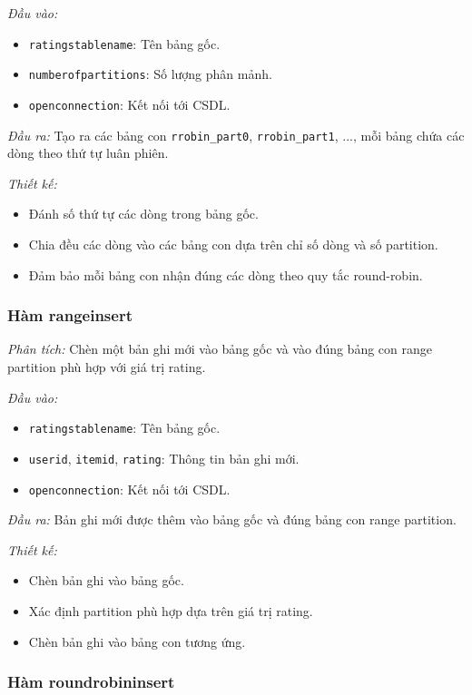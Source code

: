 \documentclass[14pt]{extarticle}
\begin{document}
\textit{Đầu vào:}
\begin{itemize}
    \item \texttt{ratingstablename}: Tên bảng gốc.
    \item \texttt{numberofpartitions}: Số lượng phân mảnh.
    \item \texttt{openconnection}: Kết nối tới CSDL.
\end{itemize}

\textit{Đầu ra:}  
Tạo ra các bảng con \texttt{rrobin\_part0}, \texttt{rrobin\_part1}, ..., mỗi bảng chứa các dòng theo thứ tự luân phiên.

\textit{Thiết kế:}
\begin{itemize}
    \item Đánh số thứ tự các dòng trong bảng gốc.
    \item Chia đều các dòng vào các bảng con dựa trên chỉ số dòng và số partition.
    \item Đảm bảo mỗi bảng con nhận đúng các dòng theo quy tắc round-robin.
\end{itemize}

\subsubsection{Hàm rangeinsert}


\textit{Phân tích:}  
Chèn một bản ghi mới vào bảng gốc và vào đúng bảng con range partition phù hợp với giá trị rating.

\textit{Đầu vào:}
\begin{itemize}
    \item \texttt{ratingstablename}: Tên bảng gốc.
    \item \texttt{userid}, \texttt{itemid}, \texttt{rating}: Thông tin bản ghi mới.
    \item \texttt{openconnection}: Kết nối tới CSDL.
\end{itemize}

\textit{Đầu ra:}  
Bản ghi mới được thêm vào bảng gốc và đúng bảng con range partition.

\textit{Thiết kế:}
\begin{itemize}
    \item Chèn bản ghi vào bảng gốc.
    \item Xác định partition phù hợp dựa trên giá trị rating.
    \item Chèn bản ghi vào bảng con tương ứng.
\end{itemize}


\subsubsection{Hàm roundrobininsert}
\end{document}
